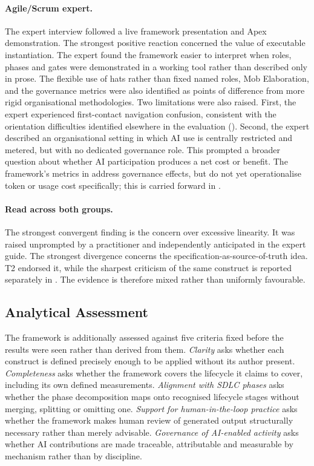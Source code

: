 \paragraph{Agile/Scrum expert.}
The expert interview followed a live framework presentation and Apex demonstration. The strongest positive reaction concerned the value of executable instantiation. The expert found the framework easier to interpret when roles, phases and gates were demonstrated in a working tool rather than described only in prose. The flexible use of hats rather than fixed named roles, Mob Elaboration, and the governance metrics were also identified as points of difference from more rigid organisational methodologies. Two limitations were also raised. First, the expert experienced first-contact navigation confusion, consistent with the orientation difficulties identified elsewhere in the evaluation (). Second, the expert described an organisational setting in which AI use is centrally restricted and metered, but with no dedicated governance role. This prompted a broader question about whether AI participation produces a net cost or benefit. The framework's metrics in  address governance effects, but do not yet operationalise token or usage cost specifically; this is carried forward in .

\paragraph{Read across both groups.}
The strongest convergent finding is the concern over excessive linearity. It was raised unprompted by a practitioner and independently anticipated in the expert guide. The strongest divergence concerns the specification-as-source-of-truth idea. T2 endorsed it, while the sharpest criticism of the same construct is reported separately in . The evidence is therefore mixed rather than uniformly favourable.


\subsection{Analytical Assessment}
\label{sec:analytical}
The framework is additionally assessed against five criteria fixed before the results were seen rather than derived from them. \emph{Clarity} asks whether each construct is defined precisely enough to be applied without its author present. \emph{Completeness} asks whether the framework covers the lifecycle it claims to cover, including its own defined measurements. \emph{Alignment with \ac{SDLC} phases} asks whether the phase decomposition maps onto recognised lifecycle stages without merging, splitting or omitting one. \emph{Support for human-in-the-loop practice} asks whether the framework makes human review of generated output structurally necessary rather than merely advisable. \emph{Governance of AI-enabled activity} asks whether AI contributions are made traceable, attributable and measurable by mechanism rather than by discipline.

